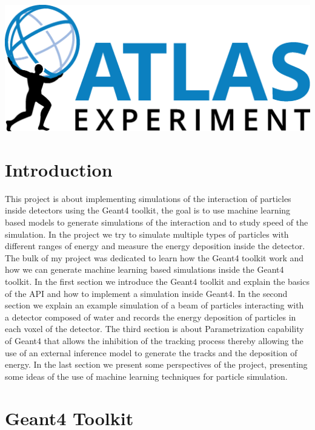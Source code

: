 \documentclass[11pt,a4paper]{report}
\begin{document}
\begin{titlepage}
		\hfill
		\includegraphics[scale=0.5]{imgs/atlas_logo.png}

		\vfill

	\end{titlepage}

	\tableofcontents

	\chapter{\sc Introduction}
	This project is about implementing simulations of the interaction of particles inside detectors using the Geant4 toolkit, the goal is to use machine learning based models to generate simulations of the interaction and to study speed of the simulation. In the project we try to simulate multiple types of particles with different ranges of energy and measure the energy deposition inside the detector. The bulk of my project was dedicated to learn how the Geant4 toolkit work and how we can generate machine learning based simulations inside the Geant4 toolkit. In the first section we introduce the Geant4 toolkit and explain the basics of the API and how to implement a simulation inside Geant4. In the second section we explain an example simulation of a beam of particles interacting with a detector composed of water and records the energy deposition of particles in each voxel of the detector. The third section is about Parametrization capability of Geant4 that allows the inhibition of the tracking process thereby allowing the use of an external inference model to generate the tracks and the deposition of energy. In the last section we present some perspectives of the project, presenting some ideas of the use of machine learning techniques for particle simulation.

	\chapter{\sc Geant4 Toolkit}
\end{document}

